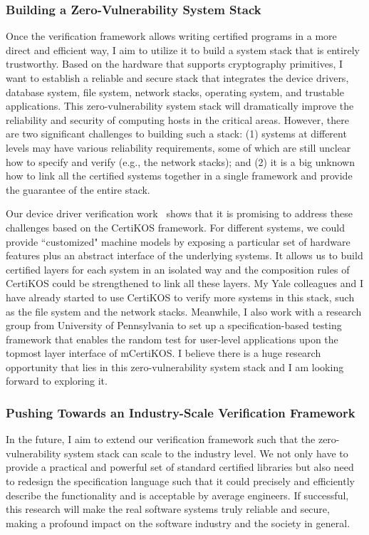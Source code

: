 \documentclass[a4paper, 10pt]{article}
\begin{document}
\begin{small}
\subsubsection*{\small Building a Zero-Vulnerability System Stack}
Once the verification framework allows writing certified programs in a more direct and efficient way, I aim to utilize it to build a system stack that is entirely trustworthy. Based on the hardware that supports cryptography primitives, I want to
establish a reliable and secure stack that integrates the device drivers,
database system, file system, network stacks, operating system,
 and trustable applications.
This zero-vulnerability system stack will dramatically improve
the reliability and security of computing hosts in the critical areas. 
However, there are two significant challenges to building such a stack:
(1)  systems at different levels may have various
reliability requirements, some of which are still unclear how
to specify and verify (e.g., the network stacks); and (2)
it is a big unknown how to link
all the certified systems together in a single framework
and provide the guarantee of the entire stack.

Our device driver verification work~\cite{pldi16-device} shows that
it is promising to address these challenges based on the CertiKOS framework. For different systems, we could
provide ``customized" machine models
by exposing a particular set of hardware features
plus an abstract interface of the underlying systems.
It allows us to build certified layers for each system
in an isolated way and the  composition rules of CertiKOS
could be strengthened to link all these layers. My Yale colleagues
and I have already started to use CertiKOS to verify more systems in this stack,
such as the file system and the network stacks.
Meanwhile, I also work with  a research group from University of Pennsylvania to
set up a specification-based testing framework
that enables the random test for user-level applications upon the topmost layer interface of mCertiKOS.
I believe there is a huge research opportunity that
lies in this zero-vulnerability system stack
and I am looking forward to exploring it.


\subsubsection*{\small Pushing Towards  an Industry-Scale Verification Framework}
In the future, I aim to 
extend our verification framework such that
the  zero-vulnerability system stack can scale to the industry level. We not only have to provide a practical and powerful
set of standard certified libraries but also need to redesign
the specification language such that
it could precisely and efficiently describe the functionality
and is acceptable by average engineers.
If successful,
this research will make
the real software systems truly reliable and secure, making  a profound impact on the software industry
 and the society in general.
 
\vspace{0.5cm}

\end{small}
\end{document}
